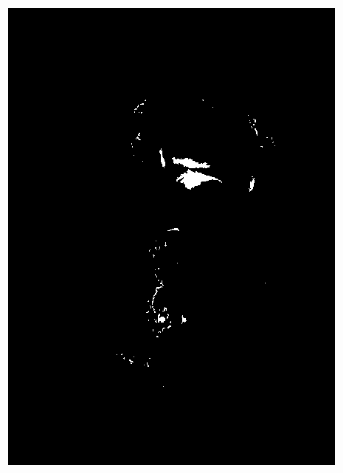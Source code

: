 \begin{figure}[H]
\begin{subfigure}{.16\textwidth}
  \includegraphics[width=0.95\textwidth]{img/fd3/grayFaceNormalEyeCandidates.png}
  \caption{}
\end{subfigure}%
\begin{subfigure}{.16\textwidth}
  \centering

\end{subfigure}
\end{figure}
